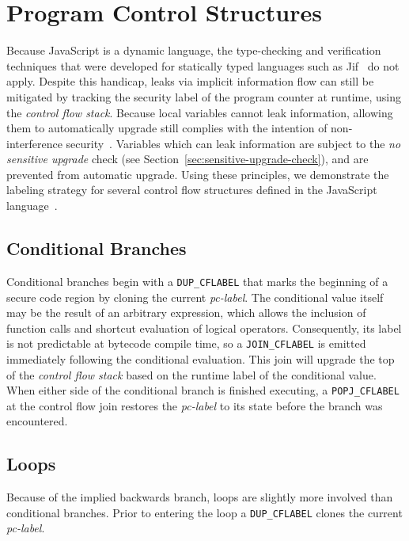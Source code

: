 \documentclass{llncs}
\begin{document}
\section{Program Control Structures}
\label{sec:program-control-structures}

Because JavaScript is a dynamic language, the type-checking and verification techniques that were developed for statically typed languages such as Jif~\cite{myers2001jif} do not apply.
Despite this handicap, leaks via implicit information flow can still be mitigated by tracking the security label of the program counter at runtime, using the \textit{control flow stack}.
Because local variables cannot leak information, allowing them to automatically upgrade still complies with the intention of non-interference security~\cite{goguen1982security}.
Variables which can leak information are subject to the \textit{no sensitive upgrade} check (see Section~\ref{sec:sensitive-upgrade-check}), and are prevented from automatic upgrade.
Using these principles, we demonstrate the labeling strategy for several control flow structures defined in the JavaScript language~\cite{ecma}.

\subsection{Conditional Branches}
Conditional branches begin with a \texttt{DUP\_CFLABEL} that marks the beginning of a secure code region by cloning the current \textit{pc-label}.
The conditional value itself may be the result of an arbitrary expression, which allows the inclusion of function calls and shortcut evaluation of logical operators.
Consequently, its label is not predictable at bytecode compile time, so a \texttt{JOIN\_CFLABEL} is emitted immediately following the conditional evaluation.
This join will upgrade the top of the \textit{control flow stack} based on the runtime label of the conditional value.
When either side of the conditional branch is finished executing, a \texttt{POPJ\_CFLABEL} at the control flow join restores the \textit{pc-label} to its state before the branch was encountered.

\subsection{Loops}

Because of the implied backwards branch, loops are slightly more involved than conditional branches.
Prior to entering the loop a \texttt{DUP\_CFLABEL} clones the current \textit{pc-label}.
\end{document}
